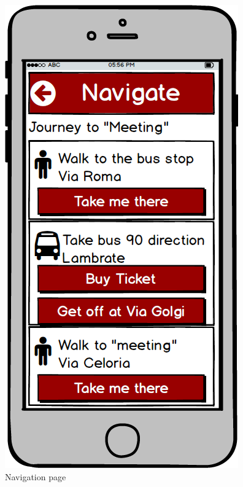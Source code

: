 \begin{figure}[!htb]

\begin{minipage}[b]{0.3\textwidth}
	\centering
	\includegraphics[scale=0.3]{images/Navigate}
	\caption{Navigation page}
	\label{ref:navigate}
\end{minipage}
\hfill
\begin{minipage}[b]{0.3\textwidth}
	\centering

\end{minipage}
\end{figure}
